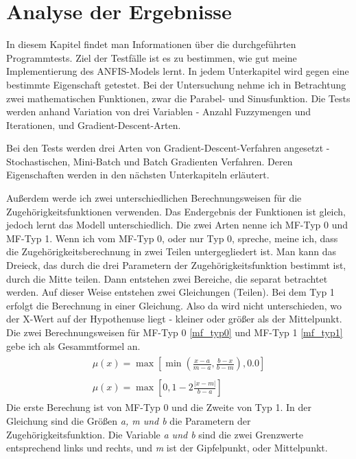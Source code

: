 \chapter{Analyse der Ergebnisse}

In diesem Kapitel findet man Informationen über die durchgeführten Programmtests. Ziel der Testfälle ist es zu bestimmen, wie gut meine Implementierung des ANFIS-Models lernt. In jedem Unterkapitel wird gegen eine bestimmte Eigenschaft getestet. Bei der Untersuchung nehme ich in Betrachtung zwei mathematischen Funktionen, zwar die Parabel- und Sinusfunktion. Die Tests werden anhand Variation von drei Variablen - Anzahl Fuzzymengen und Iterationen, und Gradient-Descent-Arten. 

Bei den Tests werden drei Arten von Gradient-Descent-Verfahren angesetzt - Stochastischen, Mini-Batch und Batch Gradienten Verfahren. Deren Eigenschaften werden in den nächsten Unterkapiteln erläutert. 

Außerdem werde ich zwei unterschiedlichen Berechnungsweisen für die Zugehörigkeitsfunktionen verwenden. Das Endergebnis der Funktionen ist gleich, jedoch lernt das Modell unterschiedlich. Die zwei Arten nenne ich MF-Typ 0 und MF-Typ 1. Wenn ich vom MF-Typ 0, oder nur Typ 0, spreche, meine ich, dass die Zugehörigkeitsberechnung in zwei Teilen untergegliedert ist. Man kann das Dreieck, das durch die drei Parametern der Zugehörigkeitsfunktion bestimmt ist, durch die Mitte teilen. Dann entstehen zwei Bereiche, die separat betrachtet werden. Auf dieser Weise entstehen zwei Gleichungen (Teilen). Bei dem Typ 1 erfolgt die Berechnung in einer Gleichung. Also da wird nicht unterschieden, wo der X-Wert auf der Hypothenuse liegt - kleiner oder größer als der Mittelpunkt. Die zwei Berechnungsweisen für MF-Typ 0 \ref{mf_typ0} und MF-Typ 1 \ref{mf_typ1} gebe ich als Gesammtformel an.
\begin{align}
	\begin{split}\label{mf_typ0}
		\mu(x) = \max[\min(\frac{x - a}{m - a}, \frac{b - x}{b - m}), 0.0]
	\end{split}\\
	\begin{split}\label{mf_typ1} 
		\mu(x) = \max[0, 1 - 2\frac{\lvert x - m\rvert}{b - a}]
	\end{split} 
\end{align}
Die erste Berechung ist von MF-Typ 0 und die Zweite von Typ 1. In der Gleichung sind die Größen \textit{a, m und b} die Parametern der Zugehörigkeitsfunktion. Die Variable \textit{a und b} sind die zwei Grenzwerte entsprechend links und rechts, und \textit{m} ist der Gipfelpunkt, oder Mittelpunkt.

